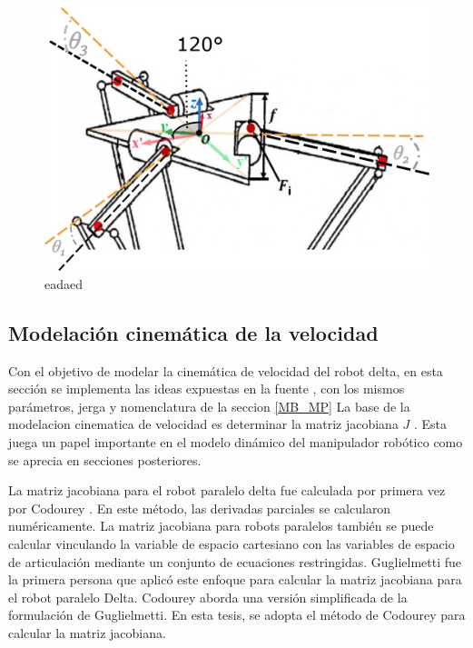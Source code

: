         \begin{figure}[htb]
                 \centering
               \includegraphics[width=1\linewidth]{Main/Chapter4/Images4/DIBUJO32.jpg}
               \caption{eadaed}
               \label{f:f:Cap4_Metodo_B_Modelacion_Cinematica_Posicion_44}
            \end{figure}
        \newpage

\subsection{Modelación cinemática de la velocidad}\label{mb_cvel}
    
        Con el objetivo de modelar la cinemática de velocidad del robot delta, en esta sección se implementa las ideas expuestas en la fuente \cite{Path_Planning_and_Trajectory_Optimization},  con los mismos parámetros, jerga y nomenclatura de la seccion  \ref{MB_MP}
        La base de la modelacion cinematica de velocidad es determinar la matriz jacobiana  \( J \) . Esta juega un papel importante en el modelo dinámico del manipulador robótico como se aprecia en secciones posteriores.\par
        
        La matriz jacobiana para el robot paralelo delta fue calculada por primera vez por Codourey \cite{Codourey:31400}. En este método, las derivadas parciales se calcularon numéricamente. La matriz jacobiana para robots paralelos también se puede calcular vinculando la variable de espacio cartesiano con las variables de espacio de articulación mediante un conjunto de ecuaciones restringidas. Guglielmetti \cite{Guglielmetti:31706} fue la primera persona que aplicó este enfoque para calcular la matriz jacobiana para el robot paralelo Delta. Codourey \cite{DynamicCodourey} aborda una versión simplificada de la formulación de Guglielmetti. En esta tesis, se adopta el método de Codourey para calcular la matriz jacobiana.

